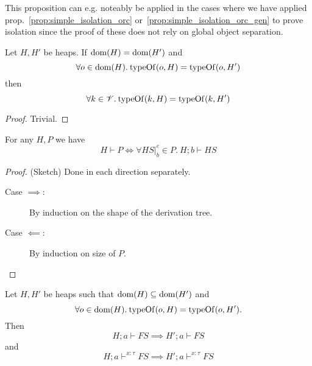 \begin{remark}
  This proposition can e.g. noteably be applied in the cases where we have
  applied prop.~\ref{prop:simple_isolation_orc}
  or~\ref{prop:simple_isolation_orc_gen} to prove isolation since the proof of
  these does not rely on global object separation.
\end{remark}

\begin{proposition}
  Let $H, H'$ be heaps. If $\mbox{$\mathrm{dom}$}{(H)} = \mbox{$\mathrm{dom}$}{(H')}$ and
  \begin{equation*}
    \forall o \in \mbox{$\mathrm{dom}$}{(H)}. \: \mbox{$\mathrm{typeOf}$}{(o, H)} = \mbox{$\mathrm{typeOf}$}{(o, H')}
  \end{equation*}
  then 
  \begin{equation*}
    \forall k \in \mathscr{V}. \: \mbox{$\mathrm{typeOf}$}{(k, H)} = \mbox{$\mathrm{typeOf}$}{(k, H')}
  \end{equation*}
\end{proposition}

\begin{proof}
  Trivial.
\end{proof}

\begin{proposition} \label{prop:tprocseq}
  For any $H, P$ we have 
  \begin{equation}
    H \vdash P \iff \forall HS|_b^e \in P.\: H;b \vdash HS
  \end{equation}
\end{proposition}

\begin{proof} (Sketch) Done in each direction separately.
  \begin{description}
    \item[Case $\implies$:] By induction on the shape of the derivation tree.
    \item[Case $\impliedby$:] By induction on size of $P$.
  \end{description}
\end{proof}

\begin{proposition}
  Let $H, H'$ be heaps such that $\mbox{$\mathrm{dom}$}{(H)} \subseteq \mbox{$\mathrm{dom}$}{(H')}$ and 
  \begin{equation*}
    \forall o \in \mbox{$\mathrm{dom}$}{(H)}. \: \mbox{$\mathrm{typeOf}$}{(o, H)} = \mbox{$\mathrm{typeOf}$}{(o, H')}.
  \end{equation*}
  Then
  \begin{equation*}
    H; a \vdash FS \implies H'; a \vdash FS
  \end{equation*}
  and
  \begin{equation*}
    H; a \vdash^{x :\tau} FS \implies H'; a \vdash^{x: \tau} FS
  \end{equation*}
\end{proposition}


